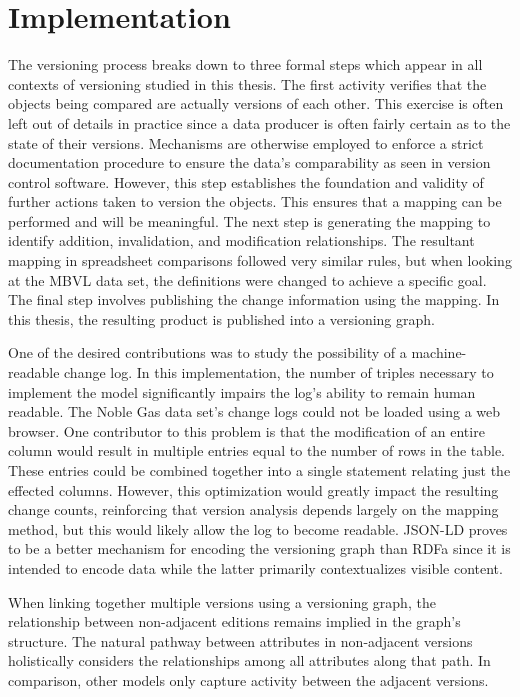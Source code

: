 \section{Implementation}

The versioning process breaks down to three formal steps which appear in all contexts of versioning studied in this thesis.
The first activity verifies that the objects being compared are actually versions of each other.
This exercise is often left out of details in practice since a data producer is often fairly certain as to the state of their versions.
Mechanisms are otherwise employed to enforce a strict documentation procedure to ensure the data's comparability as seen in version control software.
However, this step establishes the foundation and validity of further actions taken to version the objects.
This ensures that a mapping can be performed and will be meaningful.
The next step is generating the mapping to identify addition, invalidation, and modification relationships.
The resultant mapping in spreadsheet comparisons followed very similar rules, but when looking at the MBVL data set, the definitions were changed to achieve a specific goal.
The final step involves publishing the change information using the mapping.
In this thesis, the resulting product is published into a versioning graph.

One of the desired contributions was to study the possibility of a machine-readable change log.
In this implementation, the number of triples necessary to implement the model significantly impairs the log's ability to remain human readable.
The Noble Gas data set's change logs could not be loaded using a web browser.
One contributor to this problem is that the modification of an entire column would result in multiple entries equal to the number of rows in the table.
These entries could be combined together into a single statement relating just the effected columns.
However, this optimization would greatly impact the resulting change counts, reinforcing that version analysis depends largely on the mapping method, but this would likely allow the log to become readable.
JSON-LD proves to be a better mechanism for encoding the versioning graph than RDFa since it is intended to encode data while the latter primarily contextualizes visible content.

When linking together multiple versions using a versioning graph, the relationship between non-adjacent editions remains implied in the graph's structure.
The natural pathway between attributes in non-adjacent versions holistically considers the relationships among all attributes along that path.
In comparison, other models only capture activity between the adjacent versions.

